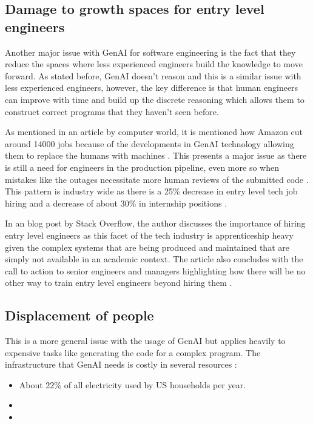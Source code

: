 \subsection{Damage to growth spaces for entry level engineers}
Another major issue with GenAI for software engineering is the fact that they reduce the spaces where less experienced engineers build the knowledge to move forward. As stated before, GenAI doesn't reason and this is a similar issue with less experienced engineers, however, the key difference is that human engineers can improve with time and build up the discrete reasoning which allows them to construct correct programs that they haven't seen before. \cite{jobs-stack-overflow}

As mentioned in an article by computer world, it is mentioned how Amazon cut around 14000 jobs because of the developments in GenAI technology allowing them to replace the humans with machines \cite{amazon-ai-layoffs}. This presents a major issue as there is still a need for engineers in the production pipeline, even more so when mistakes like the outages necessitate more human reviews of the submitted code \cite{amazon-ai-guard-rails}. This pattern is industry wide as there is a 25\% decrease in entry level tech job hiring and a decrease of about 30\% in internship positions \cite{jobs-stack-overflow}.

In an blog post by Stack Overflow, the author discusses the importance of hiring entry level engineers as this facet of the tech industry is apprenticeship heavy given the complex systems that are being produced and maintained that are simply not available in an academic context. The article also concludes with the call to action to senior engineers and managers highlighting how there will be no other way to train entry level engineers beyond hiring them \cite{stack-overflow-junior-shortage}.

\subsection{Displacement of people}
This is a more general issue with the usage of GenAI but applies heavily to expensive tasks like generating the code for a complex program. The infrastructure that GenAI needs is costly in several resources \cite{electricity-use, water-use}:

\begin{itemize}
	\item{About 22\% of all electricity used by US households per year.}
	\item{}
	\item{}
\end{itemize}

